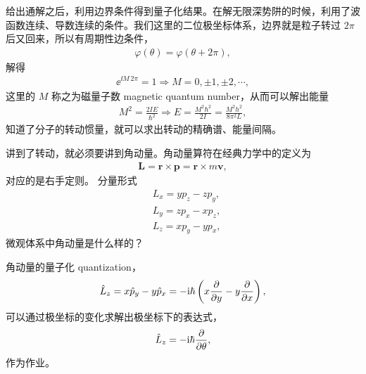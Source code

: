 给出通解之后，利用边界条件得到量子化结果。在解无限深势阱的时候，利用了波函数连续、导数连续的条件。我们这里的二位极坐标体系，边界就是粒子转过 $2\pi$ 后又回来，所以有周期性边条件，
\begin{align}
    \varphi(\theta) = \varphi(\theta + 2\pi),
\end{align}
解得
\begin{align}
    \ee^{\ii M\, 2\pi} = 1 \Rightarrow M = 0, \pm 1, \pm 2, \cdots,
\end{align}
这里的 $M$ 称之为磁量子数 magnetic quantum number，从而可以解出能量
\begin{align}
    M^2 = \frac{2IE}{\hbar^2} \Rightarrow E = \frac{M^2\hbar^2} {2I} = \frac{M^2h^2} {8\pi^2 L},
\end{align}
知道了分子的转动惯量，就可以求出转动的精确谱、能量间隔。


讲到了转动，就必须要讲到角动量。角动量算符在经典力学中的定义为
\begin{align}
    \bm L = \bm r \times \bm p = \bm r \times m\bm v, 
\end{align}
对应的是右手定则。
分量形式
\begin{align}
    &L_x = y p_z - zp_y, \\
    &L_y = z p_x - x p_z, \\
    &L_z = x p_y - y p_x, 
\end{align}
微观体系中角动量是什么样的？

角动量的量子化 quantization，
\begin{align}
    \hat L_z = x \hat p_y - y \hat p_x = - \mathrm{i} \hbar \left(x \pdv{y} - y \pdv{x}\right),
\end{align}
可以通过极坐标的变化求解出极坐标下的表达式，
\begin{align}
    \hat L_z = -\mathrm{i} \hbar \pdv{\theta},
\end{align}
作为作业。

